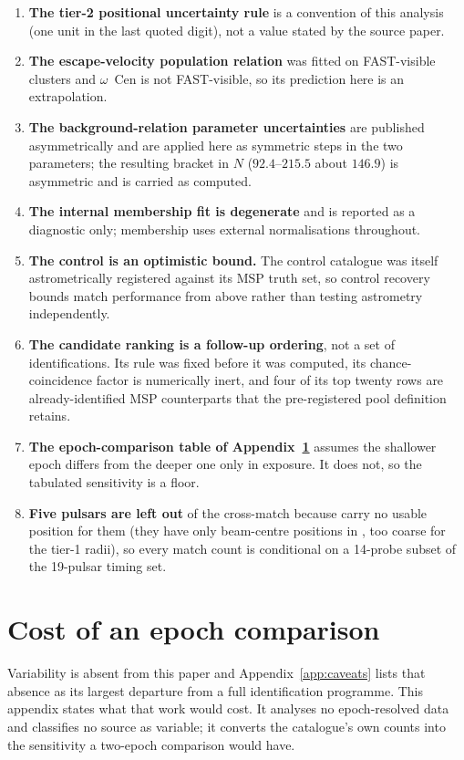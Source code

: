 \documentclass[11pt]{article}
\newcommand{\ocen}{$\omega$~Cen}
\begin{document}
\begin{enumerate}
\item \textbf{The tier-2 positional uncertainty rule} is a convention of this analysis (one unit in the last quoted digit), not a value stated by the source paper.
\item \textbf{The escape-velocity population relation} was fitted on FAST-visible clusters and \ocen{} is not FAST-visible, so its prediction here is an extrapolation.
\item \textbf{The background-relation parameter uncertainties} are published asymmetrically and are applied here as symmetric steps in the two parameters; the resulting bracket in $N$ ($92.4$--$215.5$ about $146.9$) is asymmetric and is carried as computed.
\item \textbf{The internal membership fit is degenerate} and is reported as a diagnostic only; membership uses external normalisations throughout.
\item \textbf{The control is an optimistic bound.} The control catalogue was itself astrometrically registered against its MSP truth set, so control recovery bounds match performance from above rather than testing astrometry independently.
\item \textbf{The candidate ranking is a follow-up ordering}, not a set of identifications. Its rule was fixed before it was computed, its chance-coincidence factor is numerically inert, and four of its top twenty rows are already-identified MSP counterparts that the pre-registered pool definition retains.
\item \textbf{The epoch-comparison table of Appendix~\ref{app:variability}} assumes the shallower epoch differs from the deeper one only in exposure. It does not, so the tabulated sensitivity is a floor.
\item \textbf{Five pulsars are left out} of the cross-match because \citet{ColomiBernadich2026} carry no usable position for them (they have only beam-centre positions in \citet{Chen2023}, too coarse for the tier-1 radii), so every match count is conditional on a 14-probe subset of the 19-pulsar timing set.
\end{enumerate}


\section{Cost of an epoch comparison}
\label{app:variability}

Variability is absent from this paper and Appendix~\ref{app:caveats} lists that
absence as its largest departure from a full identification programme. This
appendix states what that work would cost. It analyses no epoch-resolved data and
classifies
no source as variable; it converts the catalogue's own counts into the sensitivity
a two-epoch comparison would have.
\end{document}
